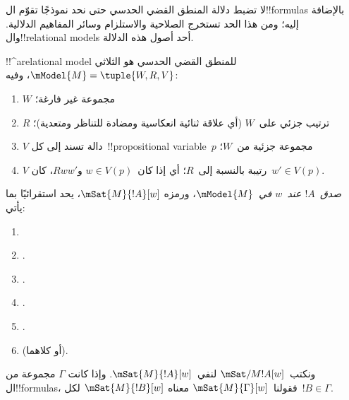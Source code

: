 \documentclass[../../../include/open-logic-section]{subfiles}
\begin{document}


لا تضبط دلالة المنطق القضي الحدسي حتى نحد نموذجًا تقوّم ال!!{formula}s
بالإضافة إليه؛ ومن هذا الحد تستخرج الصلاحية والاستلزام وسائر المفاهيم
الدلالية. وال!!{relational model}s أحد أصول هذه الدلالة.

\begin{defn}
  !!^a{relational model} للمنطق القضي الحدسي هو الثلاثي
  $\mModel{M}=\tuple{W,R,V}$، وفيه:
  \begin{enumerate}
  \item $W$ مجموعة غير فارغة؛
  \item $R$ ترتيب جزئي على~$W$ (أي علاقة ثنائية انعكاسية ومضادة للتناظر
    ومتعدية)؛
  \item $V$ دالة تسند إلى كل~!!{propositional
    variable}~$p$ مجموعة جزئية من~$W$؛
  \item $V$ رتيبة بالنسبة إلى~$R$؛ أي إذا كان~$w \in V(p)$ و$Rww'$،
    كان~$w' \in V(p)$.
  \end{enumerate}
\end{defn}

\begin{defn}
  \emph{صدق~$!A$ عند~$w$ في~$\mModel{M}$}، ورمزه
  $\mSat{M}{!A}[w]$، يحد استقرائيًا بما يأتي:
  \begin{enumerate}
  \item {}
  \item {}.
  \item {}.
  \item {}.
  \item {}.
  \item {} (أو كلاهما).
  \end{enumerate}
  ونكتب~$\mSat/{M}{!A}[w]$ لنفي~$\mSat{M}{!A}[w]$. وإذا كانت
  $\Gamma$ مجموعة من ال!!{formula}s، فقولنا~$\mSat{M}{\Gamma}[w]$ معناه
  $\mSat{M}{!B}[w]$ لكل~$!B \in \Gamma$.
\end{defn}
\end{document}
